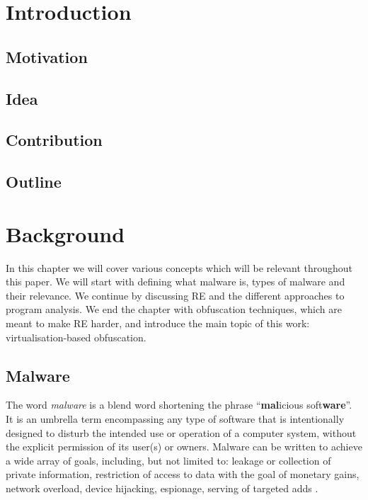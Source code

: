 \chapter{Introduction}

\section{Motivation}

\section{Idea}

\section{Contribution}

\section{Outline}

\chapter{Background}

In this chapter we will cover various concepts which will be relevant throughout this paper. We will start with defining what malware is, types of malware and their relevance. We continue by discussing \gls{RE} and the different approaches to program analysis. We end the chapter with obfuscation techniques, which are meant to make \gls{RE} harder, and introduce the main topic of this work: virtualisation-based obfuscation.

\section{Malware}

The word \emph{malware} is a blend word shortening the phrase ``\textbf{mal}icious soft\textbf{ware}''. It is an umbrella term encompassing any type of software that is intentionally designed to disturb the intended use or operation of a computer system, without the explicit permission of its user(s) or owners. Malware can be written to achieve a wide array of goals, including, but not limited to: leakage or collection of private information, restriction of access to data with the goal of monetary gains, network overload, device hijacking, espionage, serving of targeted adds \cite{wiki_malware}.

